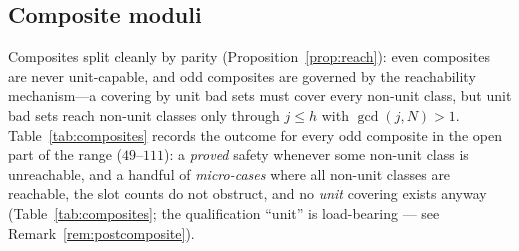 \documentclass[11pt,a4paper]{article}
\numberwithin{equation}{section}
\theoremstyle{plain}
\theoremstyle{plain}
\theoremstyle{definition}
\theoremstyle{remark}
\begin{document}
\subsection{Composite moduli}\label{sec:composites}

Composites split cleanly by parity (Proposition~\ref{prop:reach}): even
composites are never unit-capable, and odd composites are governed by the
reachability mechanism---a covering by unit bad sets must cover every
non-unit class, but unit bad sets reach non-unit classes only through
$j\le h$ with $\gcd(j,N)>1$. Table~\ref{tab:composites} records the
outcome for every odd composite in the open part of the range
($49$--$111$): a \emph{proved} safety whenever some non-unit class is
unreachable, and a handful of \emph{micro-cases} where all non-unit
classes are reachable, the slot counts do not obstruct, and no \emph{unit}
covering exists anyway (Table~\ref{tab:composites}; the qualification
``unit'' is load-bearing --- see Remark~\ref{rem:postcomposite}).
\end{document}

